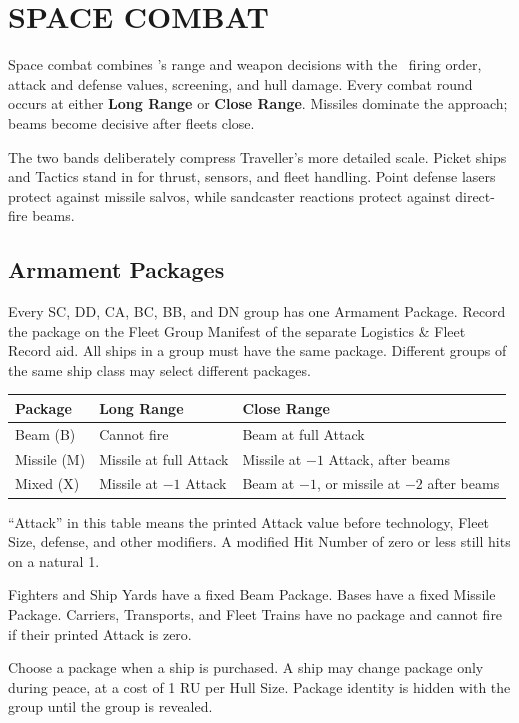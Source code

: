 \section{SPACE COMBAT}

Space combat combines \Imperium's range and weapon decisions with the
\SpaceEmpires\ firing order, attack and defense values, screening, and hull
damage. Every combat round occurs at either \textbf{Long Range} or
\textbf{Close Range}. Missiles dominate the approach; beams become decisive
after fleets close.

The two bands deliberately compress Traveller's more detailed scale. Picket
ships and Tactics stand in for thrust, sensors, and fleet handling. Point
defense lasers protect against missile salvos, while sandcaster reactions
protect against direct-fire beams.

\subsection{Armament Packages}

Every SC, DD, CA, BC, BB, and DN group has one Armament Package. Record the
package on the Fleet Group Manifest of the separate Logistics \& Fleet Record
aid. All ships in a group must have the same package. Different groups of the
same ship class may select different packages.

\begin{tabularx}{\columnwidth}{@{}lXX@{}}
\toprule
Package & Long Range & Close Range \\
\midrule
Beam (B) & Cannot fire & Beam at full Attack \\
Missile (M) & Missile at full Attack & Missile at $-1$ Attack, after beams \\
Mixed (X) & Missile at $-1$ Attack & Beam at $-1$, or missile at $-2$ after beams \\
\bottomrule
\end{tabularx}

``Attack'' in this table means the printed Attack value before technology,
Fleet Size, defense, and other modifiers. A modified Hit Number of zero or less
still hits on a natural 1.

Fighters and Ship Yards have a fixed Beam Package. Bases have a fixed Missile
Package. Carriers, Transports, and Fleet Trains have no package and cannot
fire if their printed Attack is zero.

Choose a package when a ship is purchased. A ship may change package only
during peace, at a cost of 1 RU per Hull Size. Package identity is hidden with
the group until the group is revealed.

